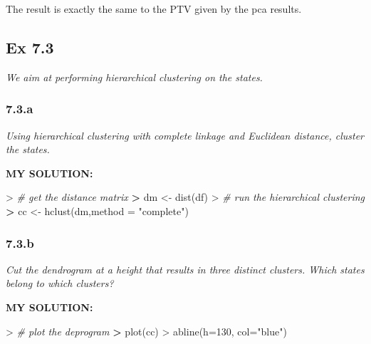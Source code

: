 \documentclass[
]{article}
\newenvironment{Shaded}{\begin{snugshade}}{\end{snugshade}}
\newcommand{\AttributeTok}[1]{\textcolor[rgb]{0.77,0.63,0.00}{#1}}
\newcommand{\CommentTok}[1]{\textcolor[rgb]{0.56,0.35,0.01}{\textit{#1}}}
\newcommand{\DecValTok}[1]{\textcolor[rgb]{0.00,0.00,0.81}{#1}}
\newcommand{\ErrorTok}[1]{\textcolor[rgb]{0.64,0.00,0.00}{\textbf{#1}}}
\newcommand{\FunctionTok}[1]{\textcolor[rgb]{0.00,0.00,0.00}{#1}}
\newcommand{\NormalTok}[1]{#1}
\newcommand{\OtherTok}[1]{\textcolor[rgb]{0.56,0.35,0.01}{#1}}
\newcommand{\SpecialCharTok}[1]{\textcolor[rgb]{0.00,0.00,0.00}{#1}}
\newcommand{\StringTok}[1]{\textcolor[rgb]{0.31,0.60,0.02}{#1}}
\begin{document}
The result is exactly the same to the PTV given by the pca results.

\hypertarget{ex-7.3}{%
\subsection{Ex 7.3}\label{ex-7.3}}

\emph{We aim at performing hierarchical clustering on the states.}

\hypertarget{a}{%
\subsubsection{7.3.a}\label{a}}

\emph{Using hierarchical clustering with complete linkage and Euclidean
distance, cluster the states.}

\textbf{MY SOLUTION:}

\begin{Shaded}
\begin{Highlighting}[]
\SpecialCharTok{\textgreater{}} \CommentTok{\# get the distance matrix}
\ErrorTok{\textgreater{}}\NormalTok{ dm }\OtherTok{\textless{}{-}} \FunctionTok{dist}\NormalTok{(df)}
\SpecialCharTok{\textgreater{}} \CommentTok{\# run the hierarchical clustering}
\ErrorTok{\textgreater{}}\NormalTok{ cc }\OtherTok{\textless{}{-}} \FunctionTok{hclust}\NormalTok{(dm,}\AttributeTok{method =} \StringTok{"complete"}\NormalTok{)}
\end{Highlighting}
\end{Shaded}

\hypertarget{b}{%
\subsubsection{7.3.b}\label{b}}

\emph{Cut the dendrogram at a height that results in three distinct
clusters. Which states belong to which clusters?}

\textbf{MY SOLUTION:}

\begin{Shaded}
\begin{Highlighting}[]
\SpecialCharTok{\textgreater{}} \CommentTok{\# plot the deprogram}
\ErrorTok{\textgreater{}} \FunctionTok{plot}\NormalTok{(cc)}
\SpecialCharTok{\textgreater{}} \FunctionTok{abline}\NormalTok{(}\AttributeTok{h=}\DecValTok{130}\NormalTok{, }\AttributeTok{col=}\StringTok{"blue"}\NormalTok{)}
\end{Highlighting}
\end{Shaded}
\end{document}
